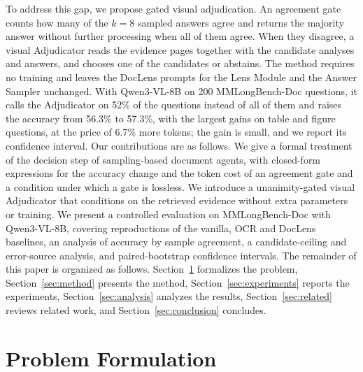 \documentclass[conference]{IEEEtran}
\begin{document}
To address this gap, we propose gated visual adjudication. An agreement gate counts how many of the $k=8$ sampled answers agree and returns the majority answer without further processing when all of them agree. When they disagree, a visual Adjudicator reads the evidence pages together with the candidate analyses and answers, and chooses one of the candidates or abstains. The method requires no training and leaves the DocLens prompts for the Lens Module and the Answer Sampler unchanged. With Qwen3-VL-8B on 200 MMLongBench-Doc questions, it calls the Adjudicator on 52\% of the questions instead of all of them and raises the accuracy from 56.3\% to 57.3\%, with the largest gains on table and figure questions, at the price of 6.7\% more tokens; the gain is small, and we report its confidence interval. Our contributions are as follows. We give a formal treatment of the decision step of sampling-based document agents, with closed-form expressions for the accuracy change and the token cost of an agreement gate and a condition under which a gate is lossless. We introduce a unanimity-gated visual Adjudicator that conditions on the retrieved evidence without extra parameters or training. We present a controlled evaluation on MMLongBench-Doc with Qwen3-VL-8B, covering reproductions of the vanilla, OCR and DocLens baselines, an analysis of accuracy by sample agreement, a candidate-ceiling and error-source analysis, and paired-bootstrap confidence intervals. The remainder of this paper is organized as follows. Section~\ref{sec:formulation} formalizes the problem, Section~\ref{sec:method} presents the method, Section~\ref{sec:experiments} reports the experiments, Section~\ref{sec:analysis} analyzes the results, Section~\ref{sec:related} reviews related work, and Section~\ref{sec:conclusion} concludes.

\section{Problem Formulation}
\label{sec:formulation}
\end{document}
